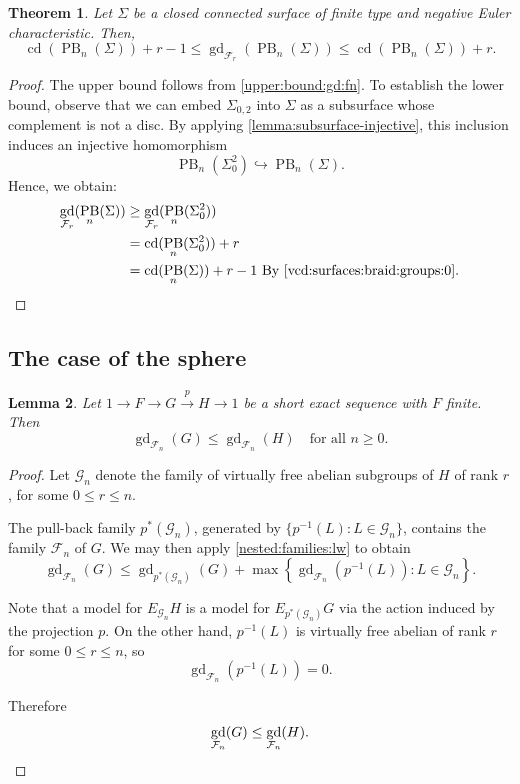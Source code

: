 \documentclass[a4paper,12pt,leqno]{amsart}
\newtheorem{theorem}{Theorem}[section]
\newtheorem{lemma}[theorem]{Lemma}
\theoremstyle{definition}
\newcommand{\calF}{{\mathcal F}}
\newcommand{\calG}{{\mathcal G}}
\DeclareMathOperator{\cd}{cd}
\DeclareMathOperator{\gd}{gd}
\DeclareMathOperator{\pb}{PB}
\begin{document}
\begin{theorem}
Let \( \Sigma \) be a closed connected surface of finite type and negative Euler characteristic. Then, 
\[
\cd(\pb_n(\Sigma)) + r-1\leq\gd_{\calF_r}(\pb_n(\Sigma)) \leq \cd(\pb_n(\Sigma)) + r.
\]
\end{theorem}
\begin{proof}
The upper bound follows from \cref{upper:bound:gd:fn}. To establish the lower bound, observe that we can embed $\Sigma_{0,2}$ into $\Sigma$ as a subsurface whose complement is not a disc. By applying \cref{lemma:subsurface-injective}, this inclusion induces an injective homomorphism
\[
\pb_n(\Sigma_0^2) \hookrightarrow \pb_n(\Sigma).
\]
Hence, we obtain:
\[
\begin{split}
\gd_{\calF_r}(\pb_n(\Sigma)) &\geq \gd_{\calF_r}(\pb_n(\Sigma_0^2)) \\
&= \cd(\pb_n(\Sigma_0^2)) + r \\
&= \cd(\pb_n(\Sigma)) + r - 1 \text{ By \cref{vcd:surfaces:braid:groups:0}}.
\end{split}
\]
\end{proof}

\subsection{The case of the sphere}

\begin{lemma}\label{upper:bound:gdf_n:ses}
Let $1 \to F \to G \xrightarrow{p} H \to 1$ be a short exact sequence with $F$
finite. Then
\[
  \gd_{\calF_n}(G) \leq \gd_{\calF_n}(H)
  \quad \text{for all } n \geq 0.
\]
\end{lemma}

\begin{proof}
Let $\calG_n$ denote the family of virtually free abelian subgroups of $H$
of rank $r$, for some  $0 \leq r \leq n$.

The pull-back family $p^*(\calG_n)$, generated by
$\{p^{-1}(L) : L \in \calG_n\}$, contains the family $\calF_n$
of $G$. We may then apply \cref{nested:families:lw} to obtain
\[
  \gd_{\calF_n}(G)
  \leq \gd_{p^*(\calG_n)}(G)
  + \max\!\left\{\gd_{\calF_n}\!\left(p^{-1}(L)\right)
    : L \in \calG_n \right\}.
\]

Note that a model for $E_{\calG_n} H$ is a model for
$E_{p^*(\calG_n)} G$ via the action induced by the projection
$p$. On the other hand, $p^{-1}(L)$ is virtually free abelian of rank $r$ for
some $0 \leq r \leq n$, so
\[
  \gd_{\calF_n}\!\left(p^{-1}(L)\right) = 0.
\]

Therefore
\[
  \gd_{\calF_n}(G) \leq \gd_{\calF_n}(H). \qedhere
\]
\end{proof}
\end{document}
